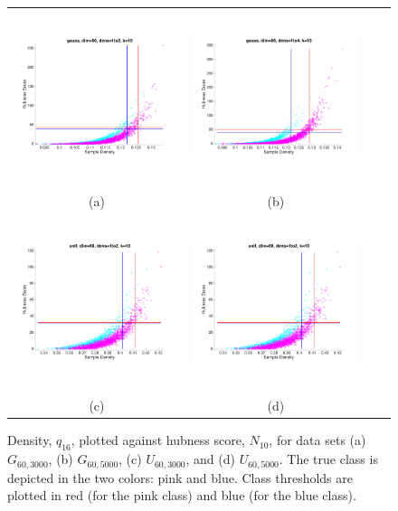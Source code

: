 \documentclass[graybox]{svmult}
\begin{document}
\begin{figure}
\centering
    \begin{tabular}{cccc}
        \includegraphics[width=2.5in,height=2in]{../fig/gauss-dim60-1to2-k10-LocDensLocHubs.png} &
        \includegraphics[width=2.5in,height=2in]{../fig/gauss-dim60-1to4-k10-LocDensLocHubs.png} \\
        {\scriptsize (a)} &  {\scriptsize (b)} \\
        \includegraphics[width=2.5in,height=2in]{../fig/unif-dim60-1to2-k10-LocDensLocHubs.png}&
        \includegraphics[width=2.5in,height=2in]{../fig/unif-dim60-1to2-k10-LocDensLocHubs.png}\\
        {\scriptsize (c)} &  {\scriptsize (d)} 
      \end{tabular}
      \caption{Density, $q_{16}$, plotted against hubness score, $N_{10}$, for data sets (a) $G_{60,3000}$, (b) $G_{60,5000}$, (c) $U_{60,3000}$, and (d) $U_{60,5000}$. The true class is depicted in the two colors: pink and blue. Class thresholds are plotted in red (for the pink class) and blue (for the blue class).}\label{fig:LocDensHubs}
\end{figure}
\end{document}
